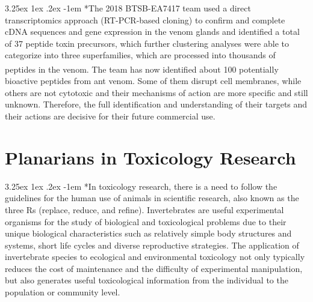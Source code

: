 \documentclass{article}
\makeatletter
\renewcommand\paragraph{\@startsection{paragraph}{4}{\z@}%
	{3.25ex \@plus1ex \@minus.2ex}%
	{-1em}%
	{\normalfont\normalsize}}
\makeatother
\begin{document}
		\paragraph*{The 2018 BTSB-EA7417 team used a direct transcriptomics approach (RT-PCR-based cloning) to confirm and complete cDNA sequences and gene expression in the venom glands and identified a total of 37 peptide toxin precursors, which further clustering analyses were able to categorize into three superfamilies, which are processed into thousands of peptides in the venom\textsuperscript{\cite{ref3}}. The team has now identified about 100 potentially bioactive peptides from ant venom. Some of them disrupt cell membranes, while others are not cytotoxic and their mechanisms of action are more specific and still unknown. Therefore, the full identification and understanding of their targets and their actions are decisive for their future commercial use.}
		
		\section*{Planarians in Toxicology Research}
		
		\paragraph*{In toxicology research, there is a need to follow the guidelines for the human use of animals in scientific research, also known as the three Rs (replace, reduce, and reﬁne). Invertebrates are useful experimental organisms for the study of biological and toxicological problems due to their unique biological characteristics such as relatively simple body structures and systems, short life cycles and diverse reproductive strategies. The application of invertebrate species to ecological and environmental toxicology not only typically reduces the cost of maintenance and the difficulty of experimental manipulation, but also generates useful toxicological information from the individual to the population or community level.}
		
\end{document}
